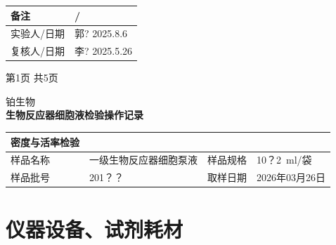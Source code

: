 \documentclass[UTF8,10pt,a4paper,fontset=fandol]{ctexart}
\newcommand{\fieldvalue}[1]{#1}
\newcommand{\handwritten}[1]{#1}
\begin{document}
\begin{tabularx}{\textwidth}{|l|X|}
\hline
备注 &
\fieldvalue{\handwritten{/}} \\ \hline
实验人/日期 &
\fieldvalue{\handwritten{郭?}}\quad
\fieldvalue{\handwritten{2025.8.6}} \\ \hline
复核人/日期 &
\fieldvalue{\handwritten{李?}}\quad
\fieldvalue{\handwritten{2025.5.26}} \\ \hline
\end{tabularx}

\begin{center}
第1页 共5页
\end{center}

\newpage

\begin{center}
铂生物\\
\textbf{生物反应器细胞液检验操作记录}
\end{center}

\begin{tabularx}{\textwidth}{|l|X|l|X|}
\hline
密度与活率检验 & \multicolumn{3}{c|}{}\\
\hline
样品名称 &
\fieldvalue{一级生物反应器细胞泵液} &
样品规格 &
\fieldvalue{\handwritten{10？2}}\ ml/袋\\
\hline
样品批号 &
\fieldvalue{\handwritten{201？？}} &
取样日期 &
\fieldvalue{\handwritten{2026年03月26日}}\\
\hline
\end{tabularx}

\section{仪器设备、试剂耗材}
\end{document}
